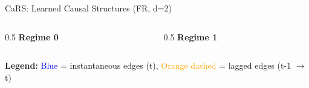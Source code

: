 \documentclass[aspectratio=169]{beamer}
\begin{document}
\begin{frame}{CaRS: Learned Causal Structures (FR, d=2)}
\begin{columns}
\begin{column}{0.5\textwidth}
\centering
\textbf{Regime 0}
\vspace{0.2cm}

\end{column}
\begin{column}{0.5\textwidth}
\centering
\textbf{Regime 1}
\vspace{0.2cm}

\end{column}
\end{columns}
\vspace{0.3cm}
\small
\textbf{Legend:} \textcolor{blue}{Blue} = instantaneous edges (t), \textcolor{orange}{Orange dashed} = lagged edges (t-1 $\rightarrow$ t)
\end{frame}
\end{document}
